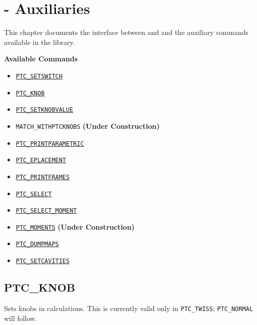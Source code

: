 
\chapter{{\madx}-{\ptc} Auxiliaries}
\label{chap:ptc-auxiliaries}

This chapter documents the interface between \madx and \ptc and the
auxiliary commands available in the \ptc library.

\textbf{Available Commands }
\begin{itemize}
   \item \hyperref[sec:ptc-setswitch]{\texttt{PTC\_SETSWITCH}}
   \item \hyperref[sec:ptc-knob]{\texttt{PTC\_KNOB}}
   \item \hyperref[sec:ptc-setknobvalue]{\texttt{PTC\_SETKNOBVALUE}}
   \item \texttt{MATCH\_WITHPTCKNOBS} \qquad \textbf{(Under Construction)}
   \item \hyperref[sec:ptc-printparametric]{\texttt{PTC\_PRINTPARAMETRIC}}
   \item \hyperref[sec:ptc-eplacement]{\texttt{PTC\_EPLACEMENT}}
   \item \hyperref[sec:ptc-printframes]{\texttt{PTC\_PRINTFRAMES}}
   \item \hyperref[sec:ptc-select]{\texttt{PTC\_SELECT}}
   \item \hyperref[sec:ptc-select-moment]{\texttt{PTC\_SELECT\_MOMENT}}
   \item \hyperref[sec:ptc-moments]{\texttt{PTC\_MOMENTS}} \qquad \textbf{(Under Construction)}
   \item \hyperref[sec:ptc-dumpmaps]{\texttt{PTC\_DUMPMAPS}}
   \item \hyperref[sec:ptc-setcavities]{\texttt{PTC\_SETCAVITIES}}
\end{itemize}

\newpage

\section{PTC\_KNOB}
\label{sec:ptc-knob}


Sets knobs in \ptc calculations. This is currently valid only in
\texttt{PTC\_TWISS}; \texttt{PTC\_NORMAL} will follow.

